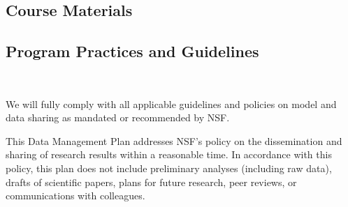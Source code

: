 \documentclass[11pt]{NSFamsart}
\begin{document}
\subsection*{Course Materials}

\subsection*{Program Practices and Guidelines}\ 

We will fully comply with all applicable guidelines and policies on model and data sharing as mandated or recommended by NSF.

This Data Management Plan addresses NSF’s policy on the dissemination and sharing of research results within a reasonable time.  In accordance with this policy, this plan does not include preliminary analyses (including raw data), drafts of scientific papers, plans for future research, peer reviews, or communications with colleagues. 
\end{document}
